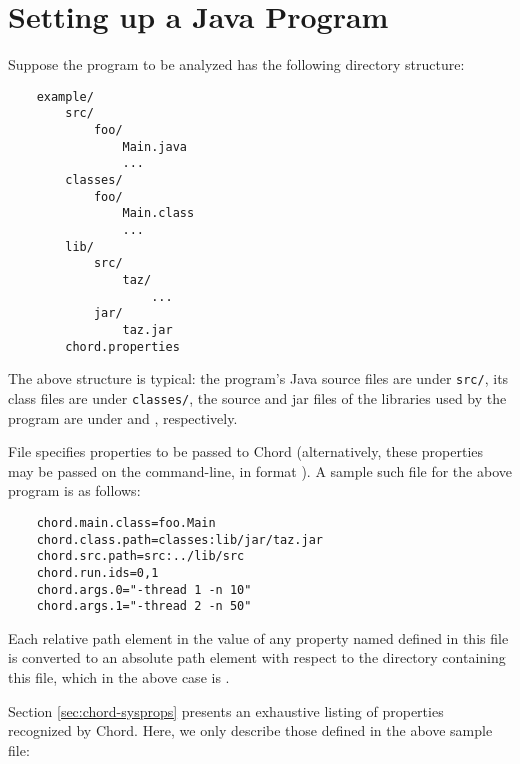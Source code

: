 \section{Setting up a Java Program}
\label{sec:program-setup}

Suppose the program to be analyzed has the following directory structure:

\begin{verbatim}
    example/
        src/
            foo/
                Main.java
                ...
        classes/
            foo/
                Main.class
                ...
        lib/
            src/
                taz/
                    ...
            jar/
                taz.jar
        chord.properties
\end{verbatim}

\noindent The above structure is typical: the program's Java source
files are under {\tt src/}, its class files are under {\tt classes/},
the source and jar files of the libraries used by the program are
under  and , respectively.

File  specifies properties to be passed to
Chord (alternatively, these properties may be passed on the
command-line, in format ).  A sample such file
for the above program is as follows:

\begin{verbatim}
    chord.main.class=foo.Main
    chord.class.path=classes:lib/jar/taz.jar
    chord.src.path=src:../lib/src
    chord.run.ids=0,1
    chord.args.0="-thread 1 -n 10"
    chord.args.1="-thread 2 -n 50"
\end{verbatim}

Each relative path element in the value of any property named
 defined in this file is converted to an
absolute path element with respect to the directory containing this
file, which in the above case is .

Section \ref{sec:chord-sysprops} presents an exhaustive listing of
properties recognized by Chord.  Here, we only describe those defined
in the above sample  file:

